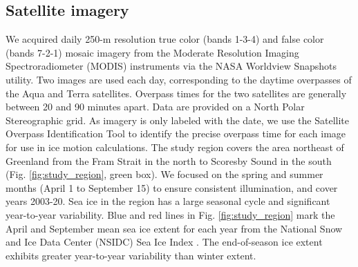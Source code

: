 \documentclass[review, jog]{igs}
\begin{document}
\subsection{Satellite imagery}
We acquired daily 250-m resolution true color (bands 1-3-4) and false color (bands 7-2-1) mosaic imagery from the Moderate Resolution Imaging Spectroradiometer (MODIS) instruments via the NASA Worldview Snapshots utility. 
Two images are used each day, corresponding to the daytime overpasses of the Aqua and Terra satellites. Overpass times for the two satellites are generally between 20 and 90 minutes apart.
Data are provided on a North Polar Stereographic grid.
As imagery is only labeled with the date, we use the Satellite Overpass Identification Tool \citep{hatcher_simon_2022_6475619} to identify the precise overpass time for each image for use in ice motion calculations.
The study region covers the area northeast of Greenland from the Fram Strait in the north to Scoresby Sound in the south (Fig. \ref{fig:study_region}, green box).
We focused on the spring and summer months (April 1 to September 15) to ensure consistent illumination, and cover years 2003-20. Sea ice in the region has a large seasonal cycle and significant year-to-year variability. Blue and red lines in Fig. \ref{fig:study_region} mark the April and September mean sea ice extent for each year from the National Snow and Ice Data Center (NSIDC) Sea Ice Index \citep{fetterer2017_SeaIce}. 
The end-of-season ice extent exhibits greater year-to-year variability than winter extent.
\end{document}
